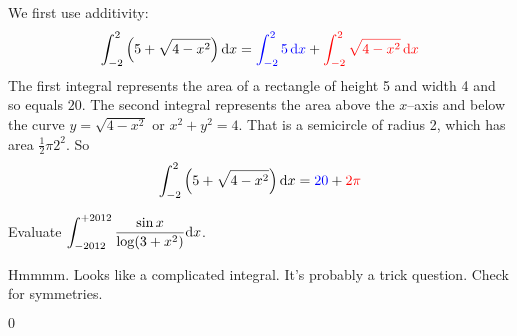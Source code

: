 \begin{solution}
We first use additivity:
\begin{align*}
 \int_{-2}^{2} \left(5+\sqrt{4-x^2}\right)\mathrm{d}x =
\textcolor{blue}{  \int_{-2}^{2} 5\,\mathrm{d}x }+ \textcolor{red}{\int_{-2}^{2} \sqrt{4-x^2}\,\mathrm{d}x}
\end{align*}
The first integral represents the area of a rectangle of height 5 and width 4 and so equals $20$.
The second integral represents the area above the $x$--axis and below the curve $y=\sqrt{4-x^2}$ or $x^2+y^2=4$. That is a semicircle of radius 2, which has area
$\frac{1}{2}\pi 2^2$. So
\begin{align*}
 \int_{-2}^{2} \left(5+\sqrt{4-x^2}\right)\mathrm{d}x =
\textcolor{blue}{20} +\textcolor{red}{2\pi}
\end{align*}

\begin{center}
\hspace{2cm}
\end{center}
\end{solution}



\begin{Mquestion}[M121 2012A]
Evaluate $\displaystyle\int_{-2012}^{+2012} \frac{\sin x}{\log(3+x^2)}\mathrm{d}x$.
\end{Mquestion}

\begin{hint}
Hmmmm.  Looks like a complicated integral. It's probably a trick question.
Check for symmetries.
\end{hint}

\begin{answer}
$0$
\end{answer}

